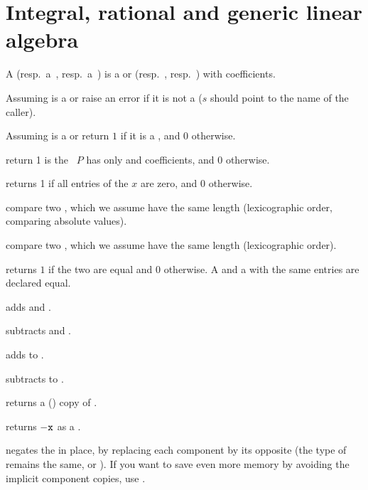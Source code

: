 \section{Integral, rational and generic linear algebra}
 A  (resp.~a~,
resp.~a~) is a  or  (resp.~,
resp.~) with  coefficients.


 Assuming  is a 
or  raise an error if it is not a  ($s$ should point to the
name of the caller).

 Assuming  is a 
or  return $1$ if it is a , and $0$ otherwise.

 return 1 is the ~$P$ has only
 and  coefficients, and 0 otherwise.

 returns 1 if all entries of the  $x$ are
zero, and $0$ otherwise.

 compare two , which we assume have
the same length (lexicographic order, comparing absolute values).

 compare two , which we assume have
the same length (lexicographic order).

 returns $1$ if the two  are equal
and $0$ otherwise. A  and a  with the same entries are
declared equal.

 adds  and .

 subtracts  and .

 adds  to .

 subtracts  to .

 returns a () copy of .

 returns $-{\tt x}$ as a .

 negates the   in place, by
replacing each component by its opposite (the type of  remains the
same,  or ). If you want to save even more memory by
avoiding the implicit component copies, use .

